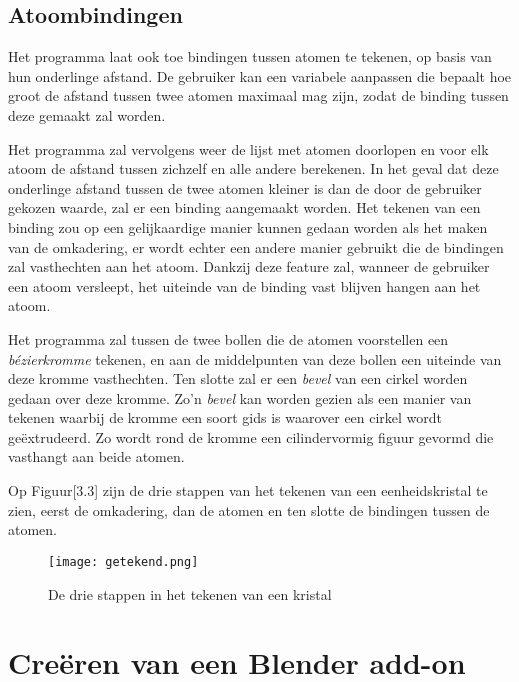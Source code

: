 \subsection{Atoombindingen}
Het programma laat ook toe bindingen tussen atomen te tekenen, op basis van hun onderlinge afstand. De gebruiker kan een variabele aanpassen die bepaalt hoe groot de afstand tussen twee atomen maximaal mag zijn, zodat de binding tussen deze gemaakt zal worden.
\par
Het programma zal vervolgens weer de lijst met atomen doorlopen en voor elk atoom de afstand tussen zichzelf en alle andere berekenen. In het geval dat deze onderlinge afstand tussen de twee atomen kleiner is dan de door de gebruiker gekozen waarde, zal er een binding aangemaakt worden. Het tekenen van een binding zou op een gelijkaardige manier kunnen gedaan worden als het maken van de omkadering, er wordt echter een andere manier gebruikt die de bindingen zal vasthechten aan het atoom. Dankzij deze feature zal, wanneer de gebruiker een atoom versleept, het uiteinde van de binding vast blijven hangen aan het atoom.
\par
Het programma zal tussen de twee bollen die de atomen voorstellen een \textit{bézierkromme} tekenen, en aan de middelpunten van deze bollen een uiteinde van deze kromme vasthechten. Ten slotte zal er een \textit{bevel} van een cirkel worden gedaan over deze kromme. Zo'n \textit{bevel} kan worden gezien als een manier van tekenen waarbij de kromme een soort gids is waarover een cirkel wordt geëxtrudeerd. Zo wordt rond de kromme een cilindervormig figuur gevormd die vasthangt aan beide atomen. 
\par
Op Figuur[3.3] zijn de drie stappen van het tekenen van een eenheidskristal te zien, eerst de omkadering, dan de atomen en ten slotte de bindingen tussen de atomen.
\begin{figure}[h]
\texttt{[image: getekend.png]}
\caption{De drie stappen in het tekenen van een kristal}
\end{figure}

\section{Creëren van een Blender add-on}

